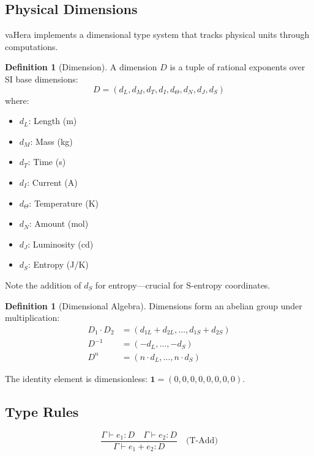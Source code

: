 \documentclass[twocolumn,10pt]{article}
\theoremstyle{definition}
\newtheorem{definition}[theorem]{Definition}
\theoremstyle{remark}
\begin{document}
\subsection{Physical Dimensions}

vaHera implements a dimensional type system \citep{kennedy1994dimension} that tracks physical units through computations.

\begin{definition}[Dimension]
A dimension $D$ is a tuple of rational exponents over SI base dimensions:
\begin{equation}
    D = (d_L, d_M, d_T, d_I, d_\Theta, d_N, d_J, d_S)
\end{equation}
where:
\begin{itemize}
    \item $d_L$: Length (m)
    \item $d_M$: Mass (kg)
    \item $d_T$: Time (s)
    \item $d_I$: Current (A)
    \item $d_\Theta$: Temperature (K)
    \item $d_N$: Amount (mol)
    \item $d_J$: Luminosity (cd)
    \item $d_S$: Entropy (J/K)
\end{itemize}
\end{definition}

Note the addition of $d_S$ for entropy—crucial for S-entropy coordinates.

\begin{definition}[Dimensional Algebra]
Dimensions form an abelian group under multiplication:
\begin{align}
    D_1 \cdot D_2 &= (d_{1L} + d_{2L}, \ldots, d_{1S} + d_{2S}) \\
    D^{-1} &= (-d_L, \ldots, -d_S) \\
    D^n &= (n \cdot d_L, \ldots, n \cdot d_S)
\end{align}

The identity element is dimensionless: $\mathbf{1} = (0,0,0,0,0,0,0,0)$.
\end{definition}

\subsection{Type Rules}

\begin{equation}
    \frac{\Gamma \vdash e_1 : D \quad \Gamma \vdash e_2 : D}{\Gamma \vdash e_1 + e_2 : D}
    \quad \text{(T-Add)}
\end{equation}
\end{document}
